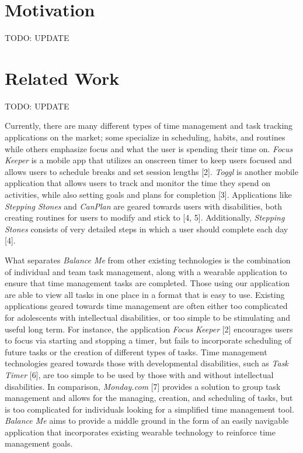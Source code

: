 \documentclass{sigchi}
\begin{document}
\section{Motivation}

\large{TODO: UPDATE}


\section{Related Work}

\large{TODO: UPDATE}

Currently, there are many different types of time management and task tracking
applications on the market; some specialize in scheduling, habits, and routines
while others emphasize focus and what the user is spending their time on.
\textit{Focus Keeper} is a mobile app that utilizes an onscreen timer to keep
users focused and allows users to schedule breaks and set session lengths [2].
\textit{Toggl} is another mobile application that allows users to track and
monitor the time they spend on activities, while also setting goals and plans
for completion [3]. Applications like \textit{Stepping Stones} and
\textit{CanPlan} are geared towards users with disabilities, both creating
routines for users to modify and stick to [4, 5]. Additionally,
\textit{Stepping Stones} consists of very detailed steps in which a user should
complete each day [4].

What separates \textit{Balance Me} from other existing technologies is the
combination of individual and team task management, along with a wearable
application to ensure that time management tasks are completed. Those using our
application are able to view all tasks in one place in a format that is easy to
use. Existing applications geared towards time management are often either too
complicated for adolescents with intellectual disabilities, or too simple to be
stimulating and useful long term. For instance, the application
\textit{Focus Keeper} [2] encourages users to focus via starting and stopping a
timer, but fails to incorporate scheduling of future tasks or the creation of
different types of tasks. Time management technologies geared towards those with
developmental disabilities, such as \textit{Task Timer} [6], are too simple to
be used by those with and without intellectual disabilities. In comparison,
\textit{Monday.com} [7] provides a solution to group task management and allows
for the managing, creation, and scheduling of tasks, but is too complicated for
individuals looking for a simplified time management tool. \textit{Balance Me}
aims to provide a middle ground in the form of an easily navigable application
that incorporates existing wearable technology to reinforce time management
goals.
\end{document}
